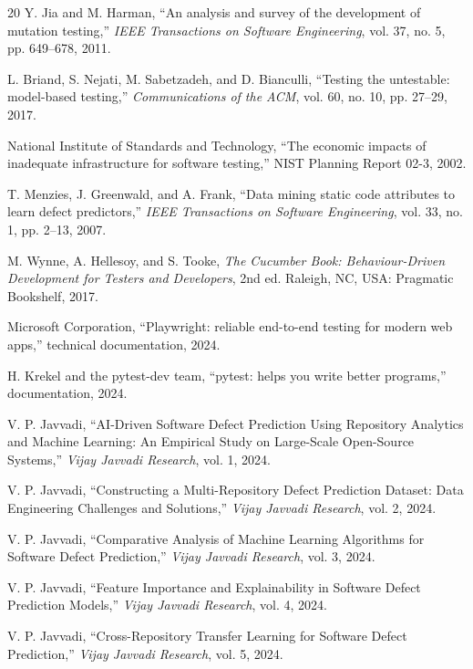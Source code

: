 \documentclass[11pt,letterpaper]{article}
\begin{document}
\begin{thebibliography}{20}
Y. Jia and M. Harman, ``An analysis and survey of the development of mutation testing,'' \textit{IEEE Transactions on Software Engineering}, vol. 37, no. 5, pp. 649--678, 2011.

L. Briand, S. Nejati, M. Sabetzadeh, and D. Bianculli, ``Testing the untestable: model-based testing,'' \textit{Communications of the ACM}, vol. 60, no. 10, pp. 27--29, 2017.

National Institute of Standards and Technology, ``The economic impacts of inadequate infrastructure for software testing,'' NIST Planning Report 02-3, 2002.

T. Menzies, J. Greenwald, and A. Frank, ``Data mining static code attributes to learn defect predictors,'' \textit{IEEE Transactions on Software Engineering}, vol. 33, no. 1, pp. 2--13, 2007.

M. Wynne, A. Hellesoy, and S. Tooke, \textit{The Cucumber Book: Behaviour-Driven Development for Testers and Developers}, 2nd ed. Raleigh, NC, USA: Pragmatic Bookshelf, 2017.

Microsoft Corporation, ``Playwright: reliable end-to-end testing for modern web apps,'' technical documentation, 2024.

H. Krekel and the pytest-dev team, ``pytest: helps you write better programs,'' documentation, 2024.

V. P. Javvadi, ``AI-Driven Software Defect Prediction Using Repository Analytics and Machine Learning: An Empirical Study on Large-Scale Open-Source Systems,'' \textit{Vijay Javvadi Research}, vol. 1, 2024.

V. P. Javvadi, ``Constructing a Multi-Repository Defect Prediction Dataset: Data Engineering Challenges and Solutions,'' \textit{Vijay Javvadi Research}, vol. 2, 2024.

V. P. Javvadi, ``Comparative Analysis of Machine Learning Algorithms for Software Defect Prediction,'' \textit{Vijay Javvadi Research}, vol. 3, 2024.

V. P. Javvadi, ``Feature Importance and Explainability in Software Defect Prediction Models,'' \textit{Vijay Javvadi Research}, vol. 4, 2024.

V. P. Javvadi, ``Cross-Repository Transfer Learning for Software Defect Prediction,'' \textit{Vijay Javvadi Research}, vol. 5, 2024.


\end{thebibliography}
\end{document}
